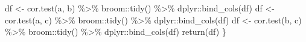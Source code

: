 \documentclass[]{tufte-handout}
\newenvironment{Shaded}{}{}
\newcommand{\FunctionTok}[1]{\textcolor[rgb]{0.02,0.16,0.49}{#1}}
\newcommand{\NormalTok}[1]{#1}
\newcommand{\OtherTok}[1]{\textcolor[rgb]{0.00,0.44,0.13}{#1}}
\newcommand{\SpecialCharTok}[1]{\textcolor[rgb]{0.25,0.44,0.63}{#1}}
\begin{document}
\begin{Shaded}
\begin{Highlighting}[numbers=left,,]
\NormalTok{  df }\OtherTok{\textless{}{-}} \FunctionTok{cor.test}\NormalTok{(a, b) }\SpecialCharTok{\%\textgreater{}\%}\NormalTok{ broom}\SpecialCharTok{::}\FunctionTok{tidy}\NormalTok{() }\SpecialCharTok{\%\textgreater{}\%}\NormalTok{ dplyr}\SpecialCharTok{::}\FunctionTok{bind\_cols}\NormalTok{(df)}
\NormalTok{  df }\OtherTok{\textless{}{-}} \FunctionTok{cor.test}\NormalTok{(a, c) }\SpecialCharTok{\%\textgreater{}\%}\NormalTok{ broom}\SpecialCharTok{::}\FunctionTok{tidy}\NormalTok{() }\SpecialCharTok{\%\textgreater{}\%}\NormalTok{ dplyr}\SpecialCharTok{::}\FunctionTok{bind\_cols}\NormalTok{(df)}
\NormalTok{  df }\OtherTok{\textless{}{-}} \FunctionTok{cor.test}\NormalTok{(b, c) }\SpecialCharTok{\%\textgreater{}\%}\NormalTok{ broom}\SpecialCharTok{::}\FunctionTok{tidy}\NormalTok{() }\SpecialCharTok{\%\textgreater{}\%}\NormalTok{ dplyr}\SpecialCharTok{::}\FunctionTok{bind\_cols}\NormalTok{(df)}
  \FunctionTok{return}\NormalTok{(df)}
\NormalTok{\}}
\end{Highlighting}
\end{Shaded}

\newpage
\end{document}
